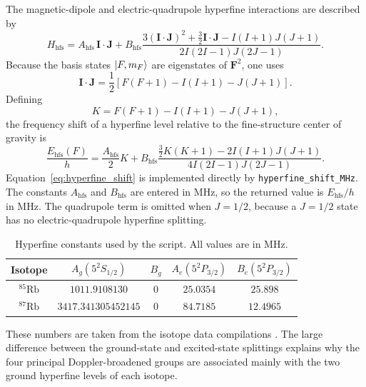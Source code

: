 The magnetic-dipole and electric-quadrupole hyperfine interactions are
described by \cite{Steck85,Steck87}
\begin{equation}
H_{\mathrm{hfs}}
=
A_{\mathrm{hfs}}\,\mathbf{I}\cdot\mathbf{J}
+
B_{\mathrm{hfs}}
\frac{
3(\mathbf{I}\cdot\mathbf{J})^{2}
+\frac{3}{2}\mathbf{I}\cdot\mathbf{J}
-I(I+1)J(J+1)
}{
2I(2I-1)J(2J-1)
}.
\label{eq:hyperfine_hamiltonian}
\end{equation}
Because the basis states \(\left|F,m_F\right\rangle\) are eigenstates of
\(\mathbf{F}^{2}\), one uses
\begin{equation}
\mathbf{I}\cdot\mathbf{J}
=
\frac{1}{2}
\left[
F(F+1)-I(I+1)-J(J+1)
\right].
\end{equation}
Defining
\begin{equation}
K=F(F+1)-I(I+1)-J(J+1),
\label{eq:hyperfine_K}
\end{equation}
the frequency shift of a hyperfine level relative to the fine-structure
center of gravity is
\begin{equation}
\frac{E_{\mathrm{hfs}}(F)}{h}
=
\frac{A_{\mathrm{hfs}}}{2}K
+
B_{\mathrm{hfs}}
\frac{
\frac{3}{2}K(K+1)-2I(I+1)J(J+1)
}{
4I(2I-1)J(2J-1)
}.
\label{eq:hyperfine_shift}
\end{equation}
Equation~\eqref{eq:hyperfine_shift} is implemented directly by
\texttt{hyperfine\_shift\_MHz}.  The constants \(A_{\mathrm{hfs}}\) and
\(B_{\mathrm{hfs}}\) are entered in MHz, so the returned value is
\(E_{\mathrm{hfs}}/h\) in MHz.  The quadrupole term is omitted when
\(J=1/2\), because a \(J=1/2\) state has no electric-quadrupole hyperfine
splitting.

\begin{table}[t]
\centering
\small
\renewcommand{\arraystretch}{1.15}
\caption{Hyperfine constants used by the script.  All values are in MHz.}
\label{tab:dm_hfs_constants}
\begin{tabular}{ccccc}
\toprule
Isotope & \(A_g(5^2S_{1/2})\) & \(B_g\) &
\(A_e(5^2P_{3/2})\) & \(B_e(5^2P_{3/2})\) \\
\midrule
\(^{85}\mathrm{Rb}\) & \(1011.9108130\) & \(0\) &
\(25.0354\) & \(25.898\) \\
\(^{87}\mathrm{Rb}\) & \(3417.341305452145\) & \(0\) &
\(84.7185\) & \(12.4965\) \\
\bottomrule
\end{tabular}
\end{table}

These numbers are taken from the isotope data compilations
\cite{Steck85,Steck87}.  The large difference between the ground-state and
excited-state splittings explains why the four principal Doppler-broadened
groups are associated mainly with the two ground hyperfine levels of each
isotope.

